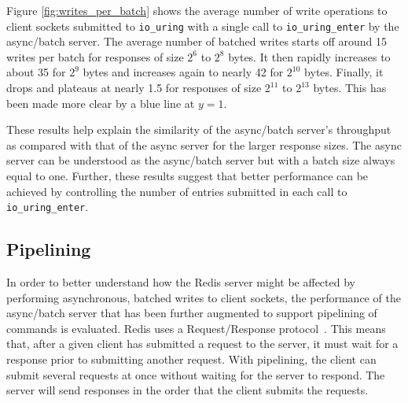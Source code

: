 \documentclass[sigconf]{acmart}
\newcommand{\inlinecode}[1]{\texttt{#1}}
\begin{document}
Figure \ref{fig:writes_per_batch} shows the average number of write operations to client sockets submitted to \inlinecode{io\_uring} with a single call to \inlinecode{io\_uring\_enter} by the async/batch server.
The average number of batched writes starts off around 15 writes per batch for responses of size $2^6$ to $2^8$ bytes.
It then rapidly increases to about 35 for $2^9$ bytes and increases again to nearly 42 for $2^{10}$ bytes.
Finally, it drops and plateaus at nearly 1.5 for responses of size $2^{11}$ to $2^{13}$ bytes.
This has been made more clear by a blue line at $y=1$.

These results help explain the similarity of the async/batch server's throughput as compared with that of the async server for the larger response sizes.
The async server can be understood as the async/batch server but with a batch size always equal to one.
Further, these results suggest that better performance can be achieved by controlling the number of entries submitted in each call to \inlinecode{io\_uring\_enter}.

\subsection{Pipelining}
In order to better understand how the Redis server might be affected by performing asynchronous, batched writes to client sockets, the performance of the async/batch server that has been further augmented to support pipelining of commands is evaluated.
Redis uses a Request/Response protocol~\cite{redis-pipeline}.
This means that, after a given client has submitted a request to the server, it must wait for a response prior to submitting another request.
With pipelining, the client can submit several requests at once without waiting for the server to respond.
The server will send responses in the order that the client submits the requests.
\end{document}
